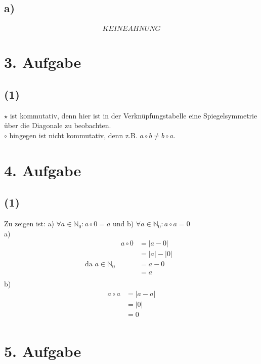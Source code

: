 \documentclass[]{article}
\begin{document}
\subsection*{a)}
	\begin{align*}
		KEINE AHNUNG
	\end{align*}
\section*{3. Aufgabe}
\subsection*{(1)}
	$\star$ ist kommutativ, denn hier ist in der Verknüpfungstabelle eine Spiegelsymmetrie über die Diagonale zu beobachten.\\
	$\circ$ hingegen ist nicht kommutativ, denn z.B. $a \circ b \neq b \circ a$.

\section*{4. Aufgabe}
\subsection*{(1)}
	Zu zeigen ist: a) $\forall a \in \mathbb{N}_0: a \circ 0 = a$ und b) $\forall a \in \mathbb{N}_0: a \circ a = 0$\\
	a)
	\begin{align*}
		&& a \circ 0 &= |a-0| &&\\
		&& &= |a|-|0| &&\\
		&\text{da $a\in\mathbb{N}_0$}& &= a-0 &&\\
		&& &= a &&\\
	\end{align*}
	b)
	\begin{align*}
		&& a \circ a &= |a-a| &&\\
		&& &= |0| &&\\
		&& &= 0 &&\\
	\end{align*}

\section*{5. Aufgabe}
\end{document}
